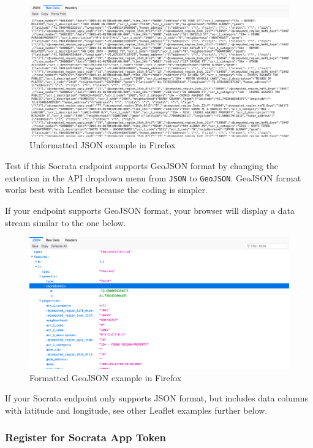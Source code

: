 \documentclass[
  english,
]{book}
\begin{document}
\begin{figure}
\centering
\includegraphics{images/13-leaflet/data-hartford-api-json-not-formatted.png}
\caption{Unformatted JSON example in Firefox}
\end{figure}

Test if this Socrata endpoint supports GeoJSON format by changing the extention in the API dropdown menu from \texttt{JSON} to \texttt{GeoJSON}. GeoJSON format works best with Leaflet because the coding is simpler.

If your endpoint supports GeoJSON format, your browser will display a data stream similar to the one below.

\begin{figure}
\centering
\includegraphics{images/13-leaflet/data-hartford-api-geojson.png}
\caption{Formatted GeoJSON example in Firefox}
\end{figure}

If your Socrata endpoint only supports JSON format, but includes data columns with latitude and longitude, see other Leaflet examples further below.

\hypertarget{register-for-socrata-app-token}{%
\subsubsection*{Register for Socrata App Token}\label{register-for-socrata-app-token}}
\end{document}
